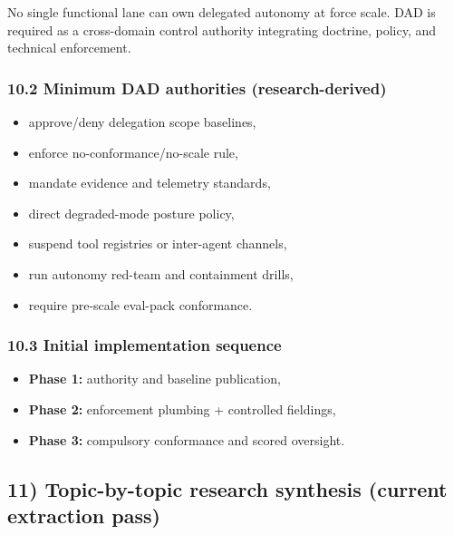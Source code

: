 \documentclass[11pt]{article}
\begin{document}
No single functional lane can own delegated autonomy at force scale. DAD
is required as a cross-domain control authority integrating doctrine,
policy, and technical enforcement.

\hypertarget{minimum-dad-authorities-research-derived}{%
\subsubsection{10.2 Minimum DAD authorities
(research-derived)}\label{minimum-dad-authorities-research-derived}}

\begin{itemize}
\tightlist
\item
  approve/deny delegation scope baselines,
\item
  enforce no-conformance/no-scale rule,
\item
  mandate evidence and telemetry standards,
\item
  direct degraded-mode posture policy,
\item
  suspend tool registries or inter-agent channels,
\item
  run autonomy red-team and containment drills,
\item
  require pre-scale eval-pack conformance.
\end{itemize}

\hypertarget{initial-implementation-sequence}{%
\subsubsection{10.3 Initial implementation
sequence}\label{initial-implementation-sequence}}

\begin{itemize}
\tightlist
\item
  \textbf{Phase 1:} authority and baseline publication,
\item
  \textbf{Phase 2:} enforcement plumbing + controlled fieldings,
\item
  \textbf{Phase 3:} compulsory conformance and scored oversight.
\end{itemize}

\hypertarget{topic-by-topic-research-synthesis-current-extraction-pass}{%
\subsection{11) Topic-by-topic research synthesis (current extraction
pass)}\label{topic-by-topic-research-synthesis-current-extraction-pass}}
\end{document}
